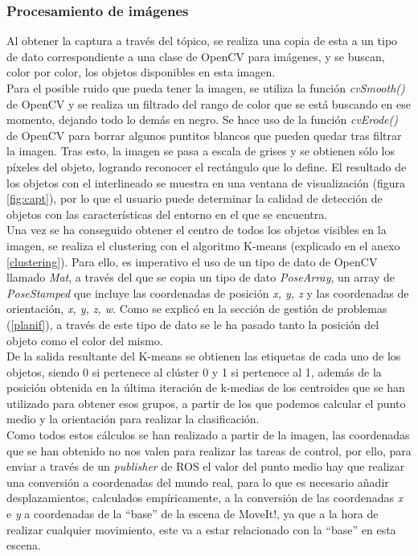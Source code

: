 \subsubsection{Procesamiento de imágenes}
\noindent Al obtener la captura a través del tópico, se realiza una copia de esta a un tipo de dato correspondiente a una clase de OpenCV para imágenes, y se buscan, color por color, los objetos disponibles en esta imagen. \\

\noindent Para el posible ruido que pueda tener la imagen, se utiliza la función \textit{cvSmooth()} \cite{smooth} de OpenCV y se realiza un filtrado del rango de color que se está buscando en ese momento, dejando todo lo demás en negro. Se hace uso de la función \textit{cvErode()} \cite{erode} de OpenCV para borrar algunos puntitos blancos que pueden quedar tras filtrar la imagen. Tras esto, la imagen se pasa a escala de grises y se obtienen sólo los píxeles del objeto, logrando reconocer el rectángulo que lo define. El resultado de los objetos con el interlineado se muestra en una ventana de visualización (figura \ref{fig:capt}), por lo que el usuario puede determinar la calidad de detección de objetos con las características del entorno en el que se encuentra. \\

\noindent Una vez se ha conseguido obtener el centro de todos los objetos visibles en la imagen, se realiza el clustering con el algoritmo K-means (explicado en el anexo \ref{clustering}). Para ello, es imperativo el uso de un tipo de dato de OpenCV llamado \textit{Mat}, a través del que se copia un tipo de dato \textit{PoseArray}, un array de \textit{PoseStamped} que incluye las coordenadas de posición \textit{x, y, z} y las coordenadas de orientación, \textit{x, y, z, w}. Como se explicó en la sección de gestión de problemas (\ref{planif}), a través de este tipo de dato se le ha pasado tanto la posición del objeto como el color del mismo. \\
De la salida resultante del K-means se obtienen las etiquetas de cada uno de los objetos, siendo 0 si pertenece al clúster 0 y 1 si pertenece al 1, además de la posición obtenida en la última iteración de k-medias de los centroides que se han utilizado para obtener esos grupos, a partir de los que podemos calcular el punto medio y la orientación para realizar la clasificación. \\

\noindent Como todos estos cálculos se han realizado a partir de la imagen, las coordenadas que se han obtenido no nos valen para realizar las tareas de control, por ello, para enviar a través de un \textit{publisher} de ROS el valor del punto medio hay que realizar una conversión a coordenadas del mundo real, para lo que es necesario añadir desplazamientos, calculados empíricamente, a la conversión de las coordenadas \textit{x} e \textit{y} a coordenadas de la ``base'' de la escena de MoveIt!, ya que a la hora de realizar cualquier movimiento, este va a estar relacionado con la ``base'' en esta escena. \\

